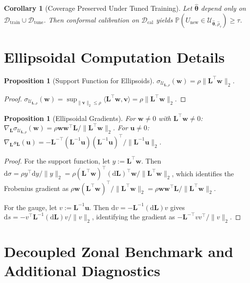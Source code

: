 \documentclass[11pt]{article}
\newcommand{\Prob}{\mathbb{P}}
\newcommand{\cU}{\mathcal{U}}
\newcommand{\cD}{\mathcal{D}}
\newcommand{\ip}[2]{\langle #1, #2 \rangle}
\newcommand{\norm}[1]{\|#1\|}
\newcommand{\btheta}{\bm{\theta}}
\newcommand{\bu}{\bm{u}}
\newcommand{\bw}{\bm{w}}
\newcommand{\bL}{\bm{L}}
\newtheorem{proposition}[theorem]{Proposition}
\newtheorem{corollary}[theorem]{Corollary}
\theoremstyle{definition}
\begin{document}
\begin{corollary}[Coverage Preserved Under Tuned Training]\label{cor:coverage-preserved}
Let $\hat{\btheta}$ depend only on $\cD_{\text{train}} \cup \cD_{\text{tune}}$. Then conformal calibration on $\cD_{\text{cal}}$ yields $\Prob(U_{\text{new}} \in \cU_{\hat{\btheta}, \hat{\rho}_\tau}) \geq \tau$.
\end{corollary}

\section{Ellipsoidal Computation Details}
\label{app:ellipsoidal}

\begin{proposition}[Support Function for Ellipsoids]\label{prop:ellipsoid-support}
$\sigma_{\cU_{\bL,\rho}}(\bw) = \rho \norm{\bL^\top \bw}_2$.
\end{proposition}

\begin{proof}
$\sigma_{\cU_{\bL,\rho}}(\bw) = \sup_{\norm{\bm{v}}_2 \leq \rho} \ip{\bL^\top\bw}{\bm{v}} = \rho \norm{\bL^\top\bw}_2$.
\end{proof}

\begin{proposition}[Ellipsoidal Gradients]\label{prop:ellipsoid-grads}
For $\bw\neq 0$ with $\bL^\top\bw\neq 0$:
$\nabla_{\bL}\sigma_{\cU_{\bL,\rho}}(\bw) = \rho\bw\bw^\top\bL/\|\bL^\top\bw\|_2$.
For $\bu\neq 0$:
$\nabla_{\bL}s_{\bL}(\bu) = -\bL^{-\top}(\bL^{-1}\bu)(\bL^{-1}\bu)^\top/\|\bL^{-1}\bu\|_2$.
\end{proposition}

\begin{proof}
For the support function, let $y:=\bL^\top\bw$. Then $\mathrm{d}\sigma = \rho y^\top\mathrm{d}y/\|y\|_2 = \rho(\bL^\top\bw)^\top(\mathrm{d}\bL)^\top\bw/\|\bL^\top\bw\|_2$, which identifies the Frobenius gradient as $\rho\bw(\bL^\top\bw)^\top/\|\bL^\top\bw\|_2 = \rho\bw\bw^\top\bL/\|\bL^\top\bw\|_2$.

For the gauge, let $v:=\bL^{-1}\bu$. Then $\mathrm{d}v=-\bL^{-1}(\mathrm{d}\bL)v$ gives $\mathrm{d}s = -v^\top\bL^{-1}(\mathrm{d}\bL)v/\|v\|_2$, identifying the gradient as $-\bL^{-\top}vv^\top/\|v\|_2$.
\end{proof}

\section{Decoupled Zonal Benchmark and Additional Diagnostics}
\label{app:zonal-reserve}
\end{document}

